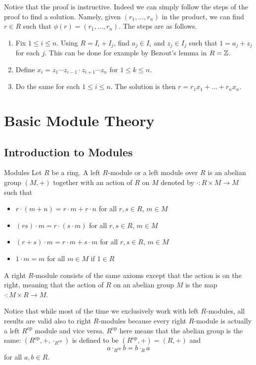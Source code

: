 \documentclass[a4paper]{article}
\begin{document}
Notice that the proof is instructive. Indeed we can simply follow the steps of the proof to find a solution. Namely, given $(r_1,\dots,r_n)$ in the product, we can find $r\in R$ such that $\phi(r)=(r_1,\dots,r_n)$. The steps are as follows. 
\begin{enumerate}
\item Fix $1\leq i\leq n$. Using $R=I_i+I_j$, find $a_j\in I_i$ and $z_j\in I_j$ such that $1=a_j+z_j$ for each $j$. This can be done for example by Bezout's lemma in $R=\mathbb{Z}$. 
\item Define $x_i=z_1\cdots z_{i-1}\cdot z_{i+1}\cdots z_n$ for $1\leq k\leq n$. 
\item Do the same for each $1\leq i\leq n$. The solution is then $r=r_1x_1+\dots+r_nx_n$. 
\end{enumerate}

\pagebreak
\section{Basic Module Theory}
\subsection{Introduction to Modules}
\begin{defn}{Modules}{} Let $R$ be a ring. A left $R$-module or a left module over $R$ is an abelian group $(M,+)$ together with an action of $R$ on $M$ denoted by $\cdot:R\times M\to M$ such that 
\begin{itemize}
\item $r\cdot (m+n)=r\cdot m+r\cdot n$ for all $r,s\in R$, $m\in M$
\item $(rs)\cdot m=r\cdot (s\cdot m)$ for all $r,s\in R$, $m\in M$
\item $(r+s)\cdot m=r\cdot m+s\cdot m$ for all $r,s\in R$, $m\in M$
\item $1\cdot m=m$ for all $m\in M$ if $1\in R$
\end{itemize}
A right $R$-module consists of the same axioms except that the action is on the right, meaning that the action of $R$ on an abelian group $M$ is the map $\cdot:M\times R\to M$. 
\end{defn}

Notice that while most of the time we exclusively work with left $R$-modules, all results are valid also to right $R$-modules because every right $R$-module is actually a left $R^{\text{op}}$ module and vice versa. $R^{\text{op}}$ here means that the abelian group is the same: $(R^{\text{op}},+,\cdot_{R^\text{op}})$ is defined to be $(R^\text{op},+)=(R,+)$ and $$a\cdot_{R^{\text{op}}}b=b\cdot_R a$$ for all $a,b\in R$. 
\end{document}
